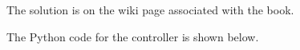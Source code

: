 
The solution is on the wiki page associated with the book.

The Python code for the controller is shown below.

%
%
%

\ifsolutionmanual




\else




\fi

   